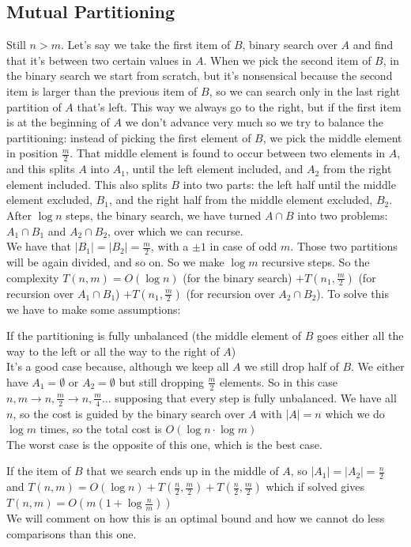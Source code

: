 \documentclass[10pt]{report}
\begin{document}
\subsection{Mutual Partitioning} Still $n > m$. Let's say we take the first item of $B$, binary search over $A$ and find that it's between two certain values in $A$. When we pick the second item of $B$, in the binary search we start from scratch, but it's nonsensical because the second item is larger than the previous item of $B$, so we can search only in the last right partition of $A$ that's left. This way we always go to the right, but if the first item is at the beginning of $A$ we don't advance very much so we try to balance the partitioning: instead of picking the first element of $B$, we pick the middle element in position $\frac{m}{2}$. That middle element is found to occur between two elements in $A$, and this splits $A$ into $A_1$, until the left element included, and $A_2$ from the right element included. This also splits $B$ into two parts: the left half until the middle element excluded, $B_1$, and the right half from the middle element excluded, $B_2$.\\
After $\log n$ steps, the binary search, we have turned $A \cap B$ into two problems: $A_1 \cap B_1$ and $A_2 \cap B_2$, over which we can recurse.\\
We have that $|B_1| = |B_2| = \frac{m}{2}$, with a $\pm 1$ in case of odd $m$. Those two partitions will be again divided, and so on. So we make $\log m$ recursive steps. So the complexity $T(n, m) = O(\log n)$ (for the binary search) $+ T(n_1, \frac{m}{2})$ (for recursion over $A_1 \cap B_1$) $+ T(n_1, \frac{m}{2})$ (for recursion over $A_2\cap B_2$). To solve this we have to make some assumptions:
\begin{list}{}{}
	\item If the partitioning is fully unbalanced (the middle element of $B$ goes either all the way to the left or all the way to the right of $A$)\\
	 It's a good case because, although we keep all $A$ we still drop half of $B$. We either have $A_1 = \emptyset$ or $A_2 = \emptyset$ but still dropping $\frac{m}{2}$ elements. So in this case $n,m \rightarrow n, \frac{m}{2}\rightarrow n, \frac{m}{4}\ldots$ supposing that every step is fully unbalanced. We have all $n$, so the cost is guided by the binary search over $A$ with $|A| = n$ which we do $\log m$ times, so the total cost is $O(\log n \cdot \log m)$\\
	 The worst case is the opposite of this one, which is the best case.
	 \item If the item of $B$ that we search ends up in the middle of $A$, so $|A_1| = |A_2| = \frac{n}{2}$ and $T(n, m) = O(\log n) + T(\frac{n}{2}, \frac{m}{2}) + T(\frac{n}{2}, \frac{m}{2})$ which if solved gives $T(n, m) = O(m(1 + \log\frac{n}{m}))$\\
	 We will comment on how this is an optimal bound and how we cannot do less comparisons than this one.
\end{list}
\end{document}

